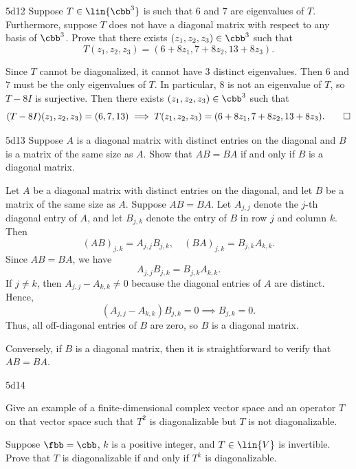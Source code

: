 \begin{exercise}{5d12}
    Suppose $T \in \lin{\cbb^3}$ is such that $6$ and $7$ are eigenvalues of $T$.
    Furthermore, suppose $T$ does not have a diagonal matrix with respect to any basis of $\cbb^3$.
    Prove that there exists $(z_1, z_2, z_3) \in \cbb^3$ such that
    \[
        T(z_1, z_2, z_3) = (6 + 8z_1, 7 + 8z_2, 13 + 8z_3).
    \]
\end{exercise}

\begin{sol}
    Since $T$ cannot be diagonalized, it cannot have 3 distinct eigenvalues.
    Then $6$ and $7$ must be the only eigenvalues of $T$.
    In particular, $8$ is not an eigenvalue of $T$, so $T - 8I$ is surjective.
    Then there exists $(z_1, z_2, z_3) \in \cbb^3$ such that
    \[
        (T - 8I)(z_1, z_2, z_3) = (6, 7, 13) \implies T(z_1, z_2, z_3) = (6 + 8z_1, 7 + 8z_2, 13 + 8z_3). \qedhere
    \]
\end{sol}

\begin{exercise}{5d13}
    Suppose $A$ is a diagonal matrix with distinct entries on the diagonal and $B$ is a matrix of the same size as $A$.
    Show that $AB = BA$ if and only if $B$ is a diagonal matrix.
\end{exercise}

\begin{sol}
    Let $A$ be a diagonal matrix with distinct entries on the diagonal, and let $B$ be a matrix of the same size as $A$.
    Suppose $AB = BA$.
    Let $A_{j, j}$ denote the $j$-th diagonal entry of $A$, and let $B_{j, k}$ denote the entry of $B$ in row $j$ and column $k$.
    Then
    \[
        (AB)_{j, k} = A_{j, j} B_{j, k}, \quad (BA)_{j, k} = B_{j, k} A_{k, k}.
    \]
    Since $AB = BA$, we have
    \[
        A_{j, j} B_{j, k} = B_{j, k} A_{k, k}.
    \]
    If $j \neq k$, then $A_{j, j} - A_{k, k} \neq 0$ because the diagonal entries of $A$ are distinct.
    Hence,
    \[
        (A_{j, j} - A_{k, k}) B_{j, k} = 0 \implies B_{j, k} = 0.
    \]
    Thus, all off-diagonal entries of $B$ are zero, so $B$ is a diagonal matrix.

    Conversely, if $B$ is a diagonal matrix, then it is straightforward to verify that $AB = BA$.
\end{sol}

\begin{exercise}{5d14}
    \begin{subexercises}
        \item Give an example of a finite-dimensional complex vector space and an operator $T$ on that vector space such that $T^2$ is diagonalizable but $T$ is not diagonalizable.
        \item Suppose $\fbb = \cbb$, $k$ is a positive integer, and $T \in \lin{V}$ is invertible.
        Prove that $T$ is diagonalizable if and only if $T^k$ is diagonalizable.
    \end{subexercises}
\end{exercise}

